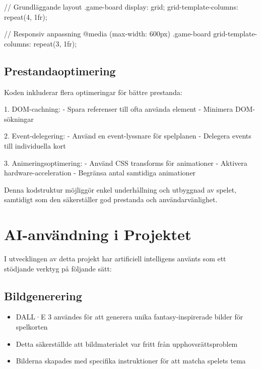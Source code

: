 \documentclass[a4paper,12pt]{article}
\begin{document}
\begin{codebox}
// Grundläggande layout
.game-board {
    display: grid;
    grid-template-columns: repeat(4, 1fr);
}

// Responsiv anpassning
@media (max-width: 600px) {
    .game-board {
        grid-template-columns: repeat(3, 1fr);
    }
}
\end{codebox}

\subsection*{Prestandaoptimering}
Koden inkluderar flera optimeringar för bättre prestanda:

\begin{codebox}
1. DOM-cachning:
   - Spara referenser till ofta använda element
   - Minimera DOM-sökningar

2. Event-delegering:
   - Använd en event-lyssnare för spelplanen
   - Delegera events till individuella kort

3. Animeringsoptimering:
   - Använd CSS transforms för animationer
   - Aktivera hardware-acceleration
   - Begränsa antal samtidiga animationer
\end{codebox}

Denna kodstruktur möjliggör enkel underhållning och utbyggnad av spelet, samtidigt som den säkerställer god prestanda och användarvänlighet.

\section*{AI-användning i Projektet}
I utvecklingen av detta projekt har artificiell intelligens använts som ett stödjande verktyg på följande sätt:

\subsection*{Bildgenerering}
\begin{itemize}
    \item DALL·E 3 användes för att generera unika fantasy-inspirerade bilder för spelkorten
    \item Detta säkerställde att bildmaterialet var fritt från upphovsrättsproblem
    \item Bilderna skapades med specifika instruktioner för att matcha spelets tema
\end{itemize}
\end{document}

